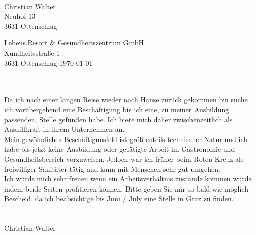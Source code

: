 \documentclass[11pt, a4paper]{article}
\begin{document}
\vspace*{1cm}
\begin{center}
  \\
\end{center}

\vspace{1cm}
Christian Walter\\
Neuhof 13\\
3631 Ottenschlag\\
\vspace{1cm}

Lebens.Resort \& Gesundheitszentrum GmbH\\
Xundheitsstraße 1\\
3631 Ottenschlag
\hfill
\today\\
\vspace{1cm}

\\\\
Da ich nach einer langen Reise wieder nach Hause zurück gekommen bin suche ich vorübergehend eine Beschäftigung bis ich eine, zu meiner Ausbildung passenden, Stelle gefunden habe. Ich biete mich daher zwischenzeitlich als Aushilfkraft in ihrem Unternehmen an.\\
Mein gewöhnliches Beschäftigunsfeld ist größtenteils technischer Natur und ich habe bis jetzt keine Ausbildung oder getätigte Arbeit im Gastronomie und Gesundheitsbereich vorzuweisen. Jedoch war ich früher beim Roten Kreuz als freiwilliger Sanitäter tätig und kann mit Menschen sehr gut umgehen.\\
Ich würde mich sehr freuen wenn ein Arbeitsverhältnis zustande kommen würde indem beide Seiten profitieren können.
Bitte geben Sie mir so bald wie möglich Bescheid, da ich beabsichtige bis Juni / July eine Stelle in Graz zu finden.\\

\\\\ Christian Walter
\end{document}
